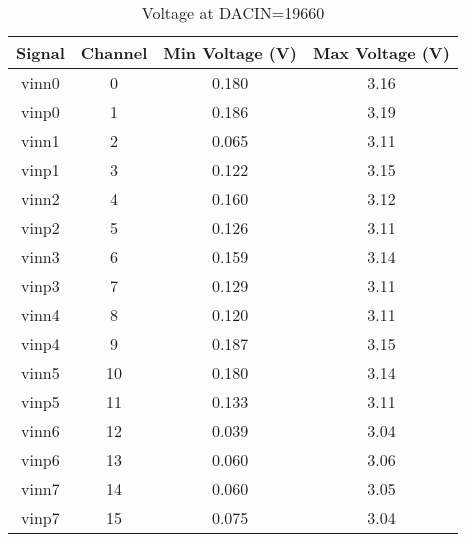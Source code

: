 \begin{table}[h!]
	\centering
	\caption{Voltage at DACIN=19660}
	\begin{tabular}{ |c|c|c|c| }
		\hline
		\textbf{Signal} & \textbf{Channel} & \textbf{Min Voltage (V)} & \textbf{Max Voltage (V)} \\
		\hline
		vinn0           & 0                & 0.180                    & 3.16                     \\
		\hline
		vinp0           & 1                & 0.186                    & 3.19                     \\
		\hline
		vinn1           & 2                & 0.065                    & 3.11                     \\
		\hline
		vinp1           & 3                & 0.122                    & 3.15                     \\
		\hline
		vinn2           & 4                & 0.160                    & 3.12                     \\
		\hline
		vinp2           & 5                & 0.126                    & 3.11                     \\
		\hline
		vinn3           & 6                & 0.159                    & 3.14                     \\
		\hline
		vinp3           & 7                & 0.129                    & 3.11                     \\
		\hline
		vinn4           & 8                & 0.120                    & 3.11                     \\
		\hline
		vinp4           & 9                & 0.187                    & 3.15                     \\
		\hline
		vinn5           & 10               & 0.180                    & 3.14                     \\
		\hline
		vinp5           & 11               & 0.133                    & 3.11                     \\
		\hline
		vinn6           & 12               & 0.039                    & 3.04                     \\
		\hline
		vinp6           & 13               & 0.060                    & 3.06                     \\
		\hline
		vinn7           & 14               & 0.060                    & 3.05                     \\
		\hline
		vinp7           & 15               & 0.075                    & 3.04                     \\
		\hline
	\end{tabular}
\end{table}

